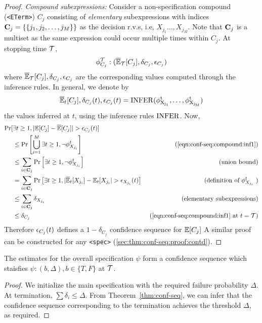 \begin{proof}
\noindent \textit{Compound subexpressions:} 
Consider a non-specification compound (\texttt{<ETerm>}) $C_j$ consisting of \textit{elementary} subexpressions with indices ${\mathbf{C}}_j = \{\{j_1, j_2, \dots, j_{M}\}\}$ as the decision r.v.s, i.e, $X_{j_1} \dots, X_{j_{M}}$.
Note that ${\mathbf{C}}_j$ is a multiset as the same expression could occur multiple times within $C_j$. 
At stopping time ${\mathcal{T}}$, 
\begin{equation}
    \phi_{C_j}^{\mathcal{T}}: (\overline{\mathbb{E}}_{\mathcal{T}}[C_j], \delta_{C_j}, {\epsilon}_{C_j})
\end{equation}
where $\overline{\mathbb{E}}_{\mathcal{T}}[C_j], \delta_{C_j}, {\epsilon}_{C_j}$ are the corresponding values computed through the inference rules.
In general, we denote by 
\begin{equation}
\overline{\mathbb{E}}_t[C_j], \delta_{C_j}(t), {\epsilon}_{C_j}(t) = \rm{INFER}(\phi^t_{X_{j_1}}, \dots, \phi^t_{X_{j_M}})
\label{eqn:conf-seq:compound:inf1}
\end{equation}
the values inferred at $t$, using the inference rules $\rm{INFER}$. 
Now,
\begin{align*}
    \Pr[&\exists t \geq 1, |\E[C_j] - \BarE[C_j]| > \eps_{C_j}(t)] & \\
        &\leq \Pr\left[\bigcup\limits_{i = 1}^{M} \exists t \geq 1,  \neg \phi_{X_{j_i}}^t \right] & \text{ (\cref{eqn:conf-seq:compound:inf1})} \\
      &\leq \sum\limits_{i\in \rmC_j}\Pr\left[\exists t \geq 1, \neg \phi^t_{X_{j_i}}\right]  & \text{ (union bound)} \\
      &= \sum\limits_{i\in \rmC_j}\Pr\left[\exists t \geq 1, |\BarE_t[X_{j_i}] - \E_t[X_{j_i}| > \epsilon_{X_{j_i}}(t)\right] &\text{(definition of $\phi^t_{X_{j_i}}$ )} \\
      &\leq \sum\limits_{i\in \rmC_j} \delta_{X_{j_i}} &  \text{ (elementary subexpressions)} \\
      &\leq \delta_{C_j} & \text{ (\cref{eqn:conf-seq:compound:inf1} at $t = \gT$)}
\end{align*}
Therefore ${\epsilon}_{C_j}(t)$ defines a $1 - \delta_{C_j}$ confidence sequence for $\mathbb{E}[C_j]$
A similar proof can be constructed for any \texttt{<spec>} (\cref{sec:thm:conf-seq:proof:contd}).
\end{proof}

\begin{corollary}
The estimates for the overall specification $\psi$ form a confidence sequence which staisfies $\psi: (b, \Delta), b \in \{T, F\}$ at ${\mathcal{T}}$.
\end{corollary}
\begin{proof}
We initialize the main specification with the required failure probability $\Delta$. 
At termination, $\sum \delta_i \leq \Delta$.
From Theorem~\ref{thm:conf-seq}, we can infer that the confidence sequence corresponding to the termination achieves the threshold $\Delta$, as required.
\end{proof}



